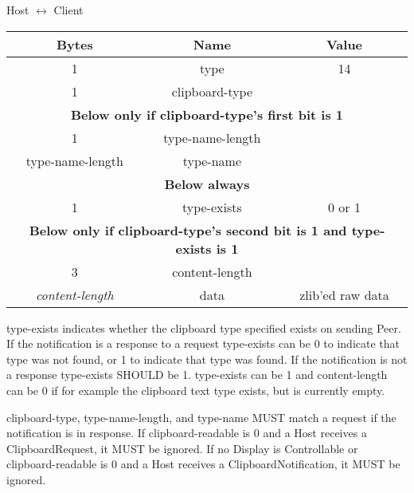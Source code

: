 \begin{center}
    Host $\leftrightarrow$ Client\\
    \begin{tabular}{|c|c|c|}
        \hline
        \textbf{Bytes}        & \textbf{Name}    & \textbf{Value}   \\
        \hline
        1                     & type             & 14               \\
        \hline
        1                     & clipboard-type   &                  \\
        \hline
        \multicolumn{3}{|c|}{\textbf{Below only if clipboard-type's first bit is 1} } \\
        \hline
        1                     & type-name-length &                  \\
        \hline
        type-name-length      & type-name        &                  \\
        \hline
        \multicolumn{3}{|c|}{\textbf{Below always} } \\
        \hline
        1                     & type-exists      & 0 or 1           \\
        \hline
        \multicolumn{3}{|c|}{\textbf{Below only if clipboard-type's second bit is 1 and type-exists is 1} }
        \\
        \hline
        3 & content-length             & \\
        \hline
        \emph{content-length} & data             & zlib'ed raw data \\
        \hline
    \end{tabular}
\end{center}

type-exists indicates whether the clipboard type specified exists on sending Peer.
If the notification is a response to a request type-exists can be 0 to indicate that type was not found, or 1 to indicate that type was found.
If the notification is not a response type-exists SHOULD be 1.
type-exists can be 1 and content-length can be 0 if for example the clipboard text type exists, but is currently empty.

clipboard-type, type-name-length, and type-name MUST match a request if the notification is in response. If
clipboard-readable is 0 and a Host receives a ClipboardRequest, it MUST be ignored. If no Display is Controllable or
clipboard-readable is 0 and a Host receives a ClipboardNotification, it MUST be ignored.\\

